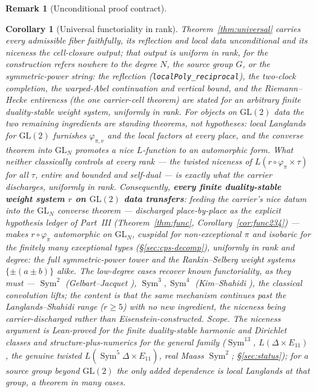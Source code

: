 \documentclass[11pt]{article}
\newtheorem{corollary}[theorem]{Corollary}
\theoremstyle{definition}
\newtheorem{remark}[theorem]{Remark}
\newcommand{\Sym}{\operatorname{Sym}}
\begin{document}
\begin{remark}[Unconditional proof contract]
\begin{enumerate}
\begin{corollary}[Universal functoriality in rank]\label{cor:universal}
Theorem~\ref{thm:universal} carries every admissible fiber faithfully, its reflection and local data
unconditional and its niceness the cell-closure output; that output is uniform in rank, for the
construction refers nowhere to the degree $N$, the source group $G$, or the symmetric-power string: the
reflection (\texttt{localPoly\_reciprocal}), the two-clock completion, the warped-Abel continuation and vertical
bound, and the Riemann--Hecke entireness (the one carrier-cell theorem) are stated for an \emph{arbitrary} finite
duality-stable weight system, \emph{uniformly in rank}. For objects on $\mathrm{GL}(2)$ data the two remaining
ingredients are standing theorems, not hypotheses: local Langlands for $\mathrm{GL}(2)$ furnishes
$\varphi_{\pi,v}$ and the local factors at every place, and the converse theorem into $\mathrm{GL}_N$ \cite{CPS}
promotes a nice $L$-function to an automorphic form. What neither classically controls at every rank --- the
twisted niceness of $L(r\circ\varphi_\pi\times\tau)$ for all $\tau$, entire and bounded and self-dual --- is
exactly what the carrier discharges, uniformly in rank. Consequently, \textbf{every finite duality-stable weight
system $r$ on $\mathrm{GL}(2)$ data transfers}: feeding the carrier's nice datum into the $\mathrm{GL}_N$ converse
theorem --- discharged place-by-place as the explicit hypothesis ledger of Part~III (Theorem~\ref{thm:func},
Corollary~\ref{cor:func234}) --- makes $r\circ\varphi_\pi$ automorphic on $\mathrm{GL}_N$, cuspidal for
non-exceptional $\pi$ and isobaric for the finitely many exceptional types (\S\ref{sec:cps-decomp}), uniformly in
rank and degree: the full symmetric-power tower and the Rankin--Selberg weight systems $\{\pm(a\pm b)\}$ alike. The low-degree cases recover known functoriality, as they
must --- $\Sym^2$ (Gelbart--Jacquet \cite{GJ}), $\Sym^3,\Sym^4$ (Kim--Shahidi \cite{KimShahidi}), the classical
convolution lifts; the content is that the \emph{same} mechanism continues past the Langlands--Shahidi range
($r\ge5$) with no new ingredient, the niceness being carrier-discharged rather than Eisenstein-constructed.
\emph{Scope.} The niceness argument is Lean-proved for the finite duality-stable harmonic and Dirichlet classes
and structure-plus-numerics for the general family ($\Sym^{13}$, $L(\Delta\times E_{11})$, the genuine twisted $L(\Sym^5\Delta\times E_{11})$, real Maass $\Sym^2$;
\S\ref{sec:status}); for a source group beyond $\mathrm{GL}(2)$ the only added dependence is local Langlands at
that group, a theorem in many cases.
\end{corollary}


\end{enumerate}
\end{remark}
\end{document}

